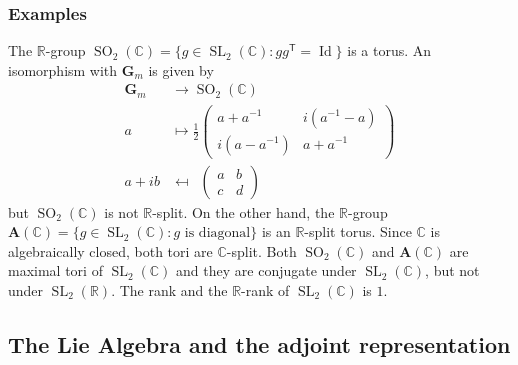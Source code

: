 \documentclass[12pt]{amsart}
\newcommand{\R}{\mathbb{R} }
\newcommand{\C}{\mathbb{C} }
\newcommand{\Id}{\operatorname{Id} }
\newcommand{\bG}{\mathbf{G}}
\newcommand{\bA}{\mathbf{A}}
\newcommand{\tran}{{^{\mathsf{T}}\!}}
\numberwithin{equation}{section}
\theoremstyle{remark} %
\begin{document}
  
  
 
 \subsubsection{Examples}\label{sec:ex_split}
 The $\R$-group $\operatorname{SO}_2(\mathbb{C}) = \{ g \in \operatorname{SL}_2(\C) \colon gg\tran = \Id \}$ is a torus. An isomorphism with $\bG_m$ is given by
 \begin{align*}
 	\bG_m & \to \operatorname{SO}_2(\mathbb{C}) \\
   a & \mapsto \frac{1}{2}\begin{pmatrix}
 	a+a^{-1} & i (a^{-1}-a) \\
 	i(a - a^{-1}) & a+a^{-1}
 \end{pmatrix}  \\
	 a+ib & \mapsfrom \phantom{\frac{1}{2}}  \begin{pmatrix}
	a & b \\
	c & d
\end{pmatrix}
 \end{align*}
 but $\operatorname{SO}_2(\mathbb{C})$ is not $\R$-split. %
 On the other hand, the $\R$-group $\bA(\mathbb{C}) = \{ g \in \operatorname{SL}_2(\C) \colon g\text{ is diagonal}\}$ is an $\R$-split torus. Since $\C$ is algebraically closed, both tori are $\C$-split. Both $\operatorname{SO}_2(\mathbb{C})$ and $\bA(\mathbb{C})$ are maximal tori of $\operatorname{SL}_2(\mathbb{C})$ and they are conjugate under $\operatorname{SL}_2(\mathbb{C})$, but not under $\operatorname{SL}_2(\R)$. The rank and the $\R$-rank of $\operatorname{SL}_2(\mathbb{C})$ is $1$.
 

\subsection{The Lie Algebra and the adjoint representation}
\end{document}
